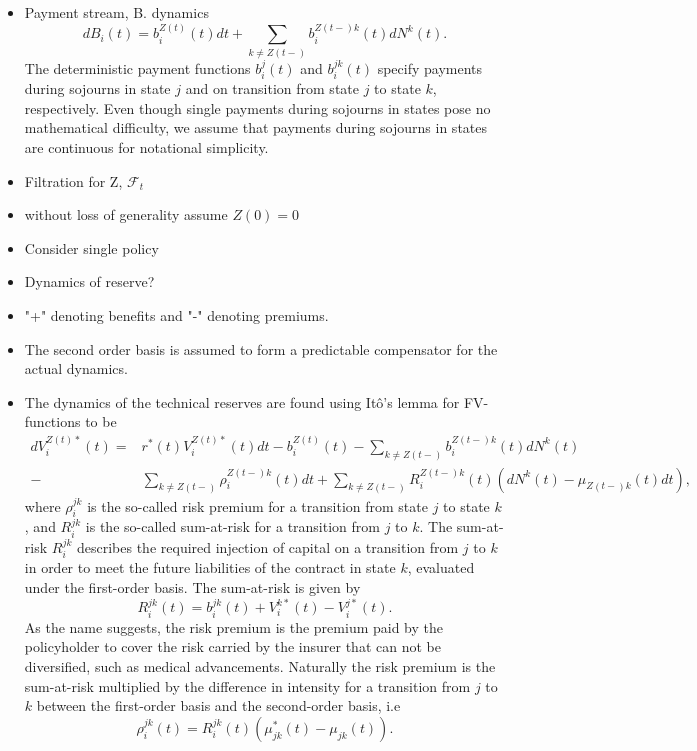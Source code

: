 \documentclass[12pt]{article}
\theoremstyle{my_thm}
\begin{document}
\begin{itemize}
\item Payment stream, B.
dynamics
$$
dB_i(t)=b_i^{Z(t)}(t) dt +\sum_{k \neq Z(t-)} b_i^{Z(t-)k}(t)dN^k(t).
$$
The deterministic payment functions $b_i^j(t)$ and $b_i^{jk}(t)$ specify payments during sojourns in state $j$ and on transition from state $j$ to state $k$, respectively. Even though single payments during sojourns in states pose no mathematical difficulty, we assume that payments during sojourns in states are continuous for notational simplicity.
\item Filtration for Z, $\mathcal{F}_t$
\item without loss of generality assume $Z(0)=0$
\item Consider single policy
\item Dynamics of reserve?
\item "+" denoting benefits and "-" denoting premiums.
\item The second order basis is assumed to form a predictable compensator for the actual dynamics.
\item The dynamics of the technical reserves are found using Itô's lemma for FV-functions to be
\begin{align}
dV_i^{Z(t)*}(t)=&r^*(t)V_i^{Z(t)*}(t)dt - b_i^{Z(t)}(t) -\sum_{k\neq Z(t-)}b_i^{Z(t-)k}(t) dN^k(t)\nonumber
\\
-&\sum_{k\neq Z(t-)} \rho_i^{Z(t-)k}(t) dt
+
\sum_{k\neq Z(t-)} R_i^{Z(t-)k}(t)(dN^k(t)-\mu_{Z(t-)k}(t) dt), \label{eq:AAP}
\end{align}
where $\rho_i^{jk}$ is the so-called risk premium for a transition from state $j$ to state $k$, and $R_i^{jk}$ is the so-called sum-at-risk for a transition from $j$ to $k$. The sum-at-risk $R_i^{jk}$ describes the required injection of capital on a transition from $j$ to $k$ in order to meet the future liabilities of the contract in state $k$, evaluated under the first-order basis. The sum-at-risk is given by
$$
R_i^{jk}(t)=b_i^{jk}(t)+V_i^{k*}(t)-V_i^{j*}(t).
$$
As the name suggests, the risk premium is the premium paid by the policyholder to cover the risk carried by the insurer that can not be diversified, such as medical advancements. Naturally the risk premium is the sum-at-risk multiplied by the difference in intensity for a transition from $j$ to $k$ between the first-order basis and the second-order basis, i.e
$$
\rho_i^{jk}(t)=R_i^{jk}(t)(\mu^*_{jk}(t)-\mu_{jk}(t)).
$$
\end{itemize}
\end{document}
